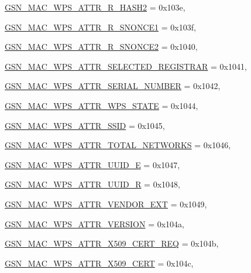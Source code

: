 \begin{DoxyCompactItemize}
\par
\hyperlink{a00642_gga0ae19d69a0b381d883890df8a7812414a896f51ad7da9054a9e30ecf48006aa23}{GSN\_\-MAC\_\-WPS\_\-ATTR\_\-R\_\-HASH2} =  0x103e, 
\par
\hyperlink{a00642_gga0ae19d69a0b381d883890df8a7812414aee2db55e6fede6b24410a216871d016e}{GSN\_\-MAC\_\-WPS\_\-ATTR\_\-R\_\-SNONCE1} =  0x103f, 
\par
\hyperlink{a00642_gga0ae19d69a0b381d883890df8a7812414a88c81608cdb2a5e022755eb117651766}{GSN\_\-MAC\_\-WPS\_\-ATTR\_\-R\_\-SNONCE2} =  0x1040, 
\par
\hyperlink{a00642_gga0ae19d69a0b381d883890df8a7812414a2523c1744d85b547d72ab907fc72f370}{GSN\_\-MAC\_\-WPS\_\-ATTR\_\-SELECTED\_\-REGISTRAR} =  0x1041, 
\par
\hyperlink{a00642_gga0ae19d69a0b381d883890df8a7812414a6d10efeab9c2b6e2ba656f8a23c3448f}{GSN\_\-MAC\_\-WPS\_\-ATTR\_\-SERIAL\_\-NUMBER} =  0x1042, 
\par
\hyperlink{a00642_gga0ae19d69a0b381d883890df8a7812414a4c38d42c808c6312f62526fd678028b2}{GSN\_\-MAC\_\-WPS\_\-ATTR\_\-WPS\_\-STATE} =  0x1044, 
\par
\hyperlink{a00642_gga0ae19d69a0b381d883890df8a7812414aa230c88c2e2ba08e4f955b304e552bf0}{GSN\_\-MAC\_\-WPS\_\-ATTR\_\-SSID} =  0x1045, 
\par
\hyperlink{a00642_gga0ae19d69a0b381d883890df8a7812414a277667b176aacf858631fd0ea6847ed3}{GSN\_\-MAC\_\-WPS\_\-ATTR\_\-TOTAL\_\-NETWORKS} =  0x1046, 
\par
\hyperlink{a00642_gga0ae19d69a0b381d883890df8a7812414ac5f48c116f9cb5dd46fd2a4e9c3e76d6}{GSN\_\-MAC\_\-WPS\_\-ATTR\_\-UUID\_\-E} =  0x1047, 
\par
\hyperlink{a00642_gga0ae19d69a0b381d883890df8a7812414aa6b19c984ca4e9f72133042f9102dcf8}{GSN\_\-MAC\_\-WPS\_\-ATTR\_\-UUID\_\-R} =  0x1048, 
\par
\hyperlink{a00642_gga0ae19d69a0b381d883890df8a7812414ad30e228111674bab9eabffe99ddf1af3}{GSN\_\-MAC\_\-WPS\_\-ATTR\_\-VENDOR\_\-EXT} =  0x1049, 
\par
\hyperlink{a00642_gga0ae19d69a0b381d883890df8a7812414ace95785bf34b55e3c792f556cd74d4c9}{GSN\_\-MAC\_\-WPS\_\-ATTR\_\-VERSION} =  0x104a, 
\par
\hyperlink{a00642_gga0ae19d69a0b381d883890df8a7812414aa3fdf34a8468ff5000c0e9ef3bacca27}{GSN\_\-MAC\_\-WPS\_\-ATTR\_\-X509\_\-CERT\_\-REQ} =  0x104b, 
\par
\hyperlink{a00642_gga0ae19d69a0b381d883890df8a7812414a6de100ee39618b50cfeea63451215faa}{GSN\_\-MAC\_\-WPS\_\-ATTR\_\-X509\_\-CERT} =  0x104c, 

\end{DoxyCompactItemize}
